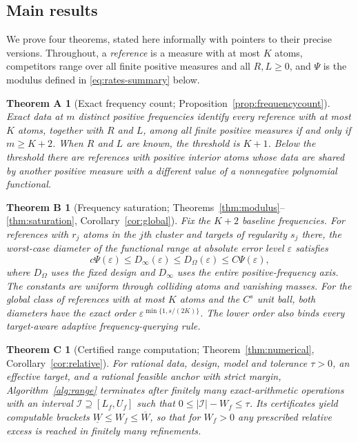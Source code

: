 \documentclass[10pt]{amsart}
\theoremstyle{definition}
\theoremstyle{remark}
\theoremstyle{plain}
\newtheorem*{mainA}{Theorem A}
\newtheorem*{mainB}{Theorem B}
\newtheorem*{mainC}{Theorem C}
\newcommand{\eps}{\varepsilon}
\begin{document}
\subsection{Main results}
We prove four theorems, stated here informally with pointers to their precise versions. Throughout, a \emph{reference} is a measure with at most $K$ atoms, competitors range over all finite positive measures and all $R,L\ge0$, and $\Psi$ is the modulus defined in \eqref{eq:rates-summary} below.

\begin{mainA}[Exact frequency count; Proposition~\ref{prop:frequencycount}]
Exact data at $m$ distinct positive frequencies identify every reference with at most $K$ atoms, together with $R$ and $L$, among all finite positive measures if and only if $m\ge K+2$. When $R$ and $L$ are known, the threshold is $K+1$. Below the threshold there are references with positive interior atoms whose data are shared by another positive measure with a different value of a nonnegative polynomial functional.
\end{mainA}

\begin{mainB}[Frequency saturation; Theorems~\ref{thm:modulus}--\ref{thm:saturation}, Corollary~\ref{cor:global}]
Fix the $K+2$ baseline frequencies. For references with $r_j$ atoms in the $j$th cluster and targets of regularity $s_j$ there, the worst-case diameter of the functional range at absolute error level $\eps$ satisfies
\[
 c\Psi(\eps)\le D_\infty(\eps)\le D_\Omega(\eps)\le C\Psi(\eps),
\]
where $D_\Omega$ uses the fixed design and $D_\infty$ uses the entire positive-frequency axis. The constants are uniform through colliding atoms and vanishing masses. For the global class of references with at most $K$ atoms and the $C^s$ unit ball, both diameters have the exact order $\eps^{\min\{1,s/(2K)\}}$. The lower order also binds every target-aware adaptive frequency-querying rule.
\end{mainB}

\begin{mainC}[Certified range computation; Theorem~\ref{thm:numerical}, Corollary~\ref{cor:relative}]
For rational data, design, model and tolerance $\tau>0$, an effective target, and a rational feasible anchor with strict margin, Algorithm~\ref{alg:range} terminates after finitely many exact-arithmetic operations with an interval $\mathcal I\supseteq[L_f,U_f]$ such that $0\le|\mathcal I|-W_f\le\tau$. Its certificates yield computable brackets $\underline W\le W_f\le\overline W$, so that for $W_f>0$ any prescribed relative excess is reached in finitely many refinements.
\end{mainC}
\end{document}
